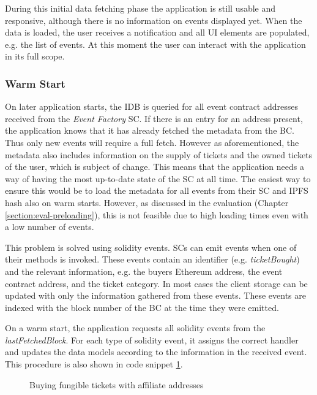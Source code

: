 During this initial data fetching phase the application is still usable and responsive, although there is no information on events displayed yet. When the data is loaded, the user receives a notification and all UI elements are populated, e.g. the list of events.
At this moment the user can interact with the application in its full scope. 

\subsubsection{Warm Start}

On later application starts, the IDB is queried for all event contract addresses received from the \textit{Event Factory} SC. If there is an entry for an address present, the application knows that it has already fetched the metadata from the BC. Thus only new events will require a full fetch. However as aforementioned, the metadata also includes information on the supply of tickets and the owned tickets of the user, which is subject of change. This means that the application needs a way of having the most up-to-date state of the SC at all time. The easiest way to ensure this would be to load the metadata for all events from their SC and IPFS hash also on warm starts. However, as discussed in the evaluation (Chapter \ref{section:eval-preloading}), this is not feasible due to high loading times even with a low number of events.

This problem is solved using solidity events. SCs can emit events when one of their methods is invoked. These events contain an identifier (e.g. \textit{ticketBought}) and the relevant information, e.g. the buyers Ethereum address, the event contract address, and the ticket category. In most cases the client storage can be updated with only the information gathered from these events. These events are indexed with the block number of the BC at the time they were emitted.

On a warm start, the application requests all solidity events from the \textit{lastFetchedBlock}. For each type of solidity event, it assigns the correct handler and updates the data models according to the information in the received event. This procedure is also shown in code snippet \ref{code:eventLoading}.

\begin{figure}[hbt]
    
    \caption{Buying fungible tickets with affiliate addresses}
    \label{code:eventLoading}
\end{figure}

